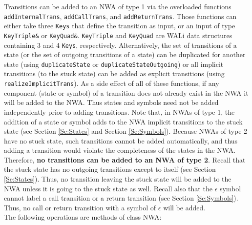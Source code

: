 \documentclass{llncs}
\begin{document}
Transitions can be added to an NWA of type 1 via the overloaded functions \texttt{addInternalTrans}, \texttt{addCallTrans}, and \texttt{addReturnTrans}.  Those functions can either take three \texttt{Keys} that define the transition as input, or an input of type \texttt{KeyTriple\&} or \texttt{KeyQuad\&}.  \texttt{KeyTriple} and \texttt{KeyQuad} are WALi data structures containing 3 and 4 \texttt{Keys}, respectively.  Alternatively, the set of transitions of a state (or the set of outgoing transitions of a state) can be duplicated for another state (using \texttt{duplicateState} or \texttt{duplicateStateOutgoing}) or all implicit transitions (to the stuck state) can be added as explicit transitions (using \texttt{realizeImplicitTrans}).  As a side effect of all of these functions, if any component (state or symbol) of a transition does not already exist in the NWA it will be added to the NWA.  Thus states and symbols need not be added independently prior to adding transitions.  Note that, in NWAs of type 1, the addition of a state or symbol adds to the NWA implicit transitions to the stuck state (see Section \ref{Se:States} and Section \ref{Se:Symbols}).  Because NWAs of type 2 have no stuck state, such transitions cannot be added automatically, and thus adding a transition would violate the completeness of the states in the NWA.  Therefore, \textbf{no transitions can be added to an NWA of type 2}.  Recall that the stuck state has no outgoing transitions except to itself (see Section \ref{Se:States}).  Thus, no transition leaving the stuck state will be added to the NWA unless it is going to the stuck state as well.  Recall also that the \texttt{$\epsilon$} symbol cannot label a call transition or a return transition (see Section \ref{Se:Symbols}).  Thus, no call or return transition with a symbol of \texttt{$\epsilon$} will be added. \\

\noindent The following operations are methods of class NWA:
\end{document}
